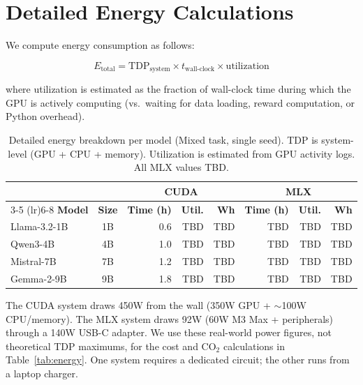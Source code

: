 \documentclass[11pt]{article}
\begin{document}
\section{Detailed Energy Calculations}
\label{app:energy}

We compute energy consumption as follows:

\begin{equation}
E_{\text{total}} = \text{TDP}_{\text{system}} \times t_{\text{wall-clock}} \times \text{utilization}
\end{equation}

\noindent where utilization is estimated as the fraction of wall-clock time during which the GPU is actively computing (vs.\ waiting for data loading, reward computation, or Python overhead).

\begin{table}[h]
\centering
\caption{Detailed energy breakdown per model (Mixed task, single seed).  TDP is system-level (GPU + CPU + memory).  Utilization is estimated from GPU activity logs.  All MLX values TBD.}
\label{tab:energy-detail}
\small
\begin{tabular}{lc rrr rrr}
\toprule
& & \multicolumn{3}{c}{\textbf{CUDA}} & \multicolumn{3}{c}{\textbf{MLX}} \\
\cmidrule(lr){3-5} \cmidrule(lr){6-8}
\textbf{Model} & \textbf{Size} & \textbf{Time (h)} & \textbf{Util.} & \textbf{Wh} & \textbf{Time (h)} & \textbf{Util.} & \textbf{Wh} \\
\midrule
Llama-3.2-1B & 1B & 0.6 & TBD & TBD & TBD & TBD & TBD \\
Qwen3-4B & 4B & 1.0 & TBD & TBD & TBD & TBD & TBD \\
Mistral-7B & 7B & 1.2 & TBD & TBD & TBD & TBD & TBD \\
Gemma-2-9B & 9B & 1.8 & TBD & TBD & TBD & TBD & TBD \\
\bottomrule
\end{tabular}
\end{table}

The CUDA system draws 450W from the wall (350W GPU + $\sim$100W CPU/memory).  The MLX system draws 92W (60W M3 Max + peripherals) through a 140W USB-C adapter.  We use these real-world power figures, not theoretical TDP maximums, for the cost and CO$_2$ calculations in Table~\ref{tab:energy}.  One system requires a dedicated circuit; the other runs from a laptop charger.
\end{document}

